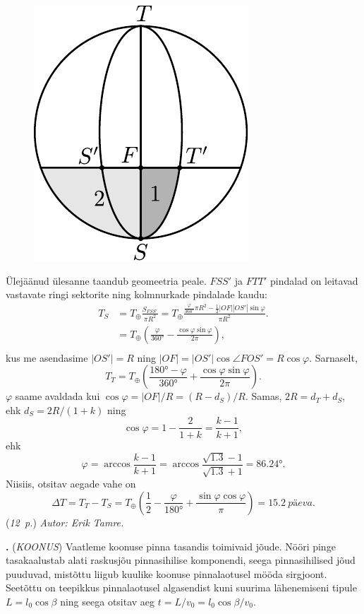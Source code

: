 \documentclass[12pt,a5paper]{article}
\newcommand{\numb}[1]{\vspace{5pt}\textbf{\large #1}}
\newcommand{\nimi}[1]{(\textsl{\small #1})}
\newcommand{\punktid}[1]{(\emph{#1~p.})}
\newcommand{\autor}[1]{\emph{ Autor: #1.}}
\newcounter{ylesanne}
\newcommand{\yl}[1]{\addtocounter{ylesanne}{1}\numb{\theylesanne.} \nimi{#1} \newblock{}}
\begin{document}
\begin{figure}[H]
	\centering
	\includegraphics[width=0.6\linewidth]{suvi-joonis-1.pdf}
\end{figure}

Ülejäänud ülesanne taandub geomeetria peale. $FSS'$ ja $FTT'$ pindalad on leitavad vastavate ringi sektorite ning kolmnurkade pindalade kaudu:
\begin{align*}
	T_S &= T_\oplus \frac{S_{FSS'}}{\pi R^2} = T_\oplus \frac{\frac{\varphi}{\ang{360}}\pi R^2 - \frac 12|OF||OS'|\sin\varphi}{\pi R^2}.\\
	&= T_\oplus \left(\frac{\varphi}{\ang{360}} - \frac{\cos\varphi\sin\varphi}{2\pi}\right),\\
\end{align*}
kus me asendasime $|OS'| = R$ ning $|OF| = |OS'|\cos\angle FOS' = R\cos\varphi$. Sarnaselt,
\[
T_T = T_\oplus \left(\frac{\ang{180} - \varphi}{\ang{360}} + \frac{\cos\varphi\sin\varphi}{2\pi}\right).
\]
$\varphi$ saame avaldada kui $\cos\varphi = |OF| / R = (R - d_S) / R$. Samas, $2R = d_T + d_S$, ehk $d_S = 2R/(1 + k)$ ning 
\[
\cos\varphi = 1 - \frac{2}{1 + k} = \frac{k - 1}{k + 1},
\]
ehk
\[
\varphi = \arccos\frac{k - 1}{k + 1} = \arccos\frac{\sqrt{\num{1.3}} - 1}{\sqrt{\num{1.3}} + 1} = \ang{86.24}.
\]
Niisiis, otsitav aegade vahe on 
\[
\Delta T = T_T - T_S = T_\oplus \left(\frac{1}{2} - \frac{\varphi}{\ang{180}} + \frac{\sin\varphi\cos\varphi}{\pi}\right) = \SI{15.2}{päeva}.
\]
\punktid{12} \autor{Erik Tamre}


\yl{KOONUS}
\osa Vaatleme koonuse pinna tasandis toimivaid jõude. Nööri pinge tasakaalustab alati raskusjõu pinnasihilise komponendi, seega pinnasihilised jõud puuduvad, mistõttu liigub kuulike koonuse pinnalaotusel mööda sirgjoont. Seetõttu on teepikkus pinnalaotusel algasendist kuni suurima lähenemiseni tipule $L=l_0\cos\beta$ ning seega otsitav aeg $t=L/v_0=l_0\cos\beta/v_0$. 
\end{document}
